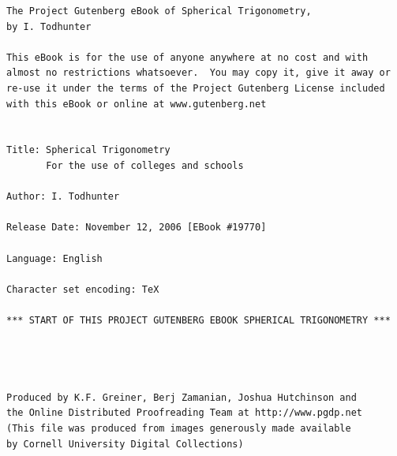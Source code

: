 \documentclass{book}[2004/02/16]
\begin{document}
\thispagestyle{empty}
\small
\begin{verbatim}
The Project Gutenberg eBook of Spherical Trigonometry,
by I. Todhunter

This eBook is for the use of anyone anywhere at no cost and with
almost no restrictions whatsoever.  You may copy it, give it away or
re-use it under the terms of the Project Gutenberg License included
with this eBook or online at www.gutenberg.net


Title: Spherical Trigonometry
       For the use of colleges and schools

Author: I. Todhunter

Release Date: November 12, 2006 [EBook #19770]

Language: English

Character set encoding: TeX

*** START OF THIS PROJECT GUTENBERG EBOOK SPHERICAL TRIGONOMETRY ***




Produced by K.F. Greiner, Berj Zamanian, Joshua Hutchinson and 
the Online Distributed Proofreading Team at http://www.pgdp.net 
(This file was produced from images generously made available 
by Cornell University Digital Collections)



\end{verbatim}
\normalsize
\newpage

\end{document}
